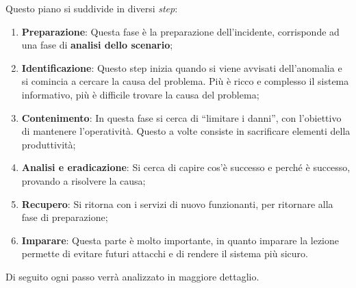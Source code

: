 Questo piano si suddivide in diversi \textit{step}:
\begin{enumerate}
\item \textbf{Preparazione}: Questa fase è la preparazione dell'incidente,
corrisponde ad una fase di \textbf{analisi dello scenario};

\item \textbf{Identificazione}: Questo step inizia quando si viene
avvisati dell'anomalia e si comincia a cercare la causa del problema.
Più è ricco e complesso il sistema informativo, più è difficile trovare
la causa del problema;

\item \textbf{Contenimento}: In questa fase si cerca di ``limitare i
danni'', con l'obiettivo di mantenere l'operatività. Questo a volte
consiste in  sacrificare elementi della produttività;

\item \textbf{Analisi e eradicazione}: Si cerca di capire cos'è successo
e perché è successo, provando a risolvere la causa;

\item \textbf{Recupero}: Si ritorna con i servizi di nuovo funzionanti,
per ritornare alla fase di preparazione;

\item \textbf{Imparare}:  Questa parte è molto importante, in quanto
imparare la lezione permette di evitare futuri attacchi e di rendere il
sistema più sicuro.

\end{enumerate}

Di seguito ogni passo verrà analizzato in maggiore dettaglio.
